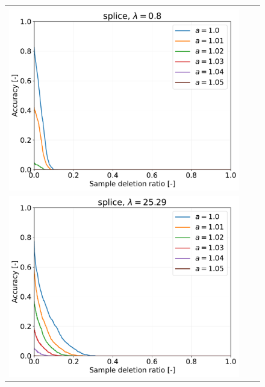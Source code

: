 \begin{figure}[H]
\begin{tabular}{ccc}
		\begin{minipage}[b]{0.3\hsize}\centering {\small Dataset: splice, $\lambda=n \cdot 10^{-3}$}\\\includegraphics[width=0.8\hsize]{fig/table_logistic/splice_scale-logistic/kernel/kernel_ss_screening_rate_lam0.8_x_n_y_etest.pdf}\end{minipage}
		&
		\begin{minipage}[b]{0.3\hsize}\centering {\small Dataset: splice, $\lambda=n_\mathrm \cdot 10^{-1.5}$}\\\includegraphics[width=0.8\hsize]{fig/table_logistic/splice_scale-logistic/kernel/kernel_ss_screening_rate_lam25.29_x_n_y_etest.pdf}\end{minipage}
		&

\end{tabular}
\end{figure}
